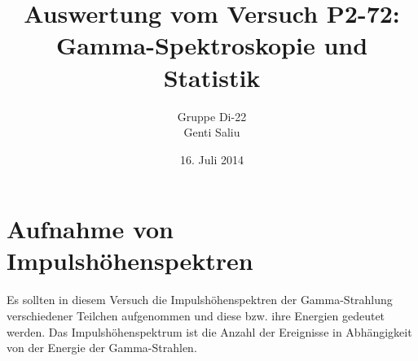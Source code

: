 \documentclass[a4paper,titlepage]{scrartcl}
\title{Auswertung vom Versuch P2-72: Gamma-Spektroskopie und Statistik}
\author{Gruppe Di-22\\Genti Saliu}
\date{16. Juli 2014}
\numberwithin{equation}{section}
\begin{document}
\begin{titlepage}
\maketitle
\thispagestyle{empty}
\end{titlepage}

\newpage
{}
\tableofcontents

\newpage
{}

\section{Aufnahme von Impulshöhenspektren}
Es sollten in diesem Versuch die Impulshöhenspektren der Gamma-Strahlung verschiedener Teilchen aufgenommen und diese bzw. ihre Energien gedeutet werden. Das Impulshöhenspektrum ist die Anzahl der Ereignisse in Abhängigkeit von der Energie der Gamma-Strahlen.
\end{document}
